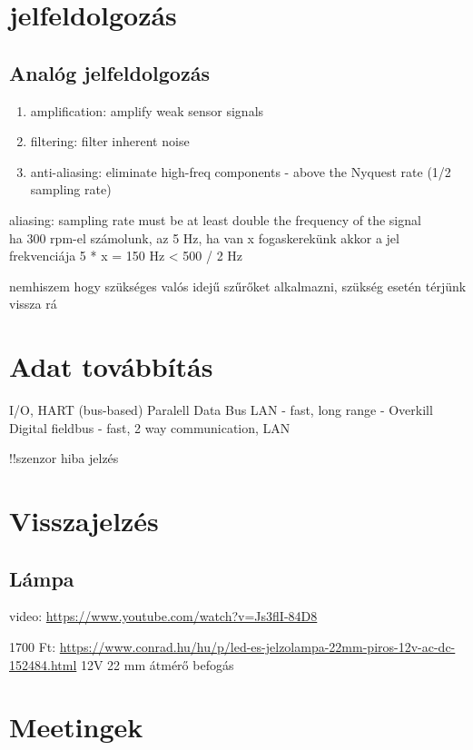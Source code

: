\documentclass{article}
\begin{document}
	
	\section{jelfeldolgozás}
	
	\subsection{Analóg jelfeldolgozás}
	\begin{enumerate}
		\item amplification: amplify weak sensor signals
		\item filtering: filter inherent noise
		\item anti-aliasing: eliminate high-freq components - above the Nyquest rate (1/2 sampling rate)
	\end{enumerate}
	aliasing: sampling rate must be at least double the frequency of the signal\\
	ha 300 rpm-el számolunk, az 5 Hz, ha van x fogaskerekünk akkor a jel frekvenciája 5 * x = 150 Hz < 500 / 2 Hz

	nemhiszem hogy szükséges valós idejű szűrőket alkalmazni, szükség esetén térjünk vissza rá
	
	\section{Adat továbbítás}
	
	I/O, HART (bus-based)
	Paralell Data Bus
	LAN - fast, long range - Overkill
	Digital fieldbus - fast, 2 way communication, LAN
	
	!!szenzor hiba jelzés
	
	\section{Visszajelzés}
	
	\subsection{Lámpa}
	
	video: \url{https://www.youtube.com/watch?v=Js3flI-84D8}

	1700 Ft: \url{https://www.conrad.hu/hu/p/led-es-jelzolampa-22mm-piros-12v-ac-dc-152484.html}
	12V
	22 mm átmérő befogás
	
	
	\section{Meetingek}
	
\end{document}
